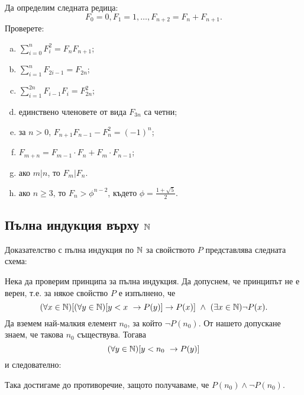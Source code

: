\begin{problem}
  Да определим следната редица:
  \[F_0 = 0,F_1 = 1,\dots,F_{n+2} = F_{n} + F_{n+1}.\]
  Проверете:
  \begin{enumerate}[a)]
  \item
    $\sum^n_{i=0} F^2_i = F_{n}F_{n+1}$;
  \item
    $\sum^n_{i=1} F_{2i-1} = F_{2n}$;
  \item
    $\sum^{2n}_{i=1}F_{i-1}F_{i} = F^2_{2n}$;
  \item
    единствено членовете от вида $F_{3n}$ са четни;
  \item
    за $n > 0$, $F_{n+1}F_{n-1} - F^2_n = (-1)^n$;
  \item
    $F_{m+n} = F_{m-1}\cdot F_{n} + F_m \cdot F_{n-1}$;
  \item
    ако $m\vert n$, то $F_m \vert F_n$.
  \item
    ако $n\geq 3$, то $F_n > \phi^{n-2}$,
    където $\phi = \frac{1+\sqrt{5}}{2}$.
  \end{enumerate}
\end{problem}

\newpage 
\subsection*{Пълна индукция върху $\Nat$}

Доказателство с пълна индукция по $\Nat$ за свойството $P$ представлява следната схема:
\begin{prooftree}
\end{prooftree}
Нека да проверим принципа за пълна индукция.
Да допуснем, че принципът не е верен, т.е. за някое свойство $P$ е изпълнено, че
\[(\forall x\in\Nat)[(\forall y\in \Nat)[y < x\ \rightarrow P(y)]\rightarrow P(x)]\ \wedge\ (\exists x\in\Nat) \neg P(x).\]
Да вземем най-малкия елемент $n_0$, за който $\neg P(n_0)$. От нашето допускане знаем, че такова $n_0$ съществува.
Тогава \[(\forall y\in \Nat)[y < n_0\ \rightarrow P(y)]\]
и следователно:
\begin{prooftree}
\end{prooftree}
Така достигаме до противоречие, защото получаваме, че $P(n_0)\wedge \neg P(n_0)$.

